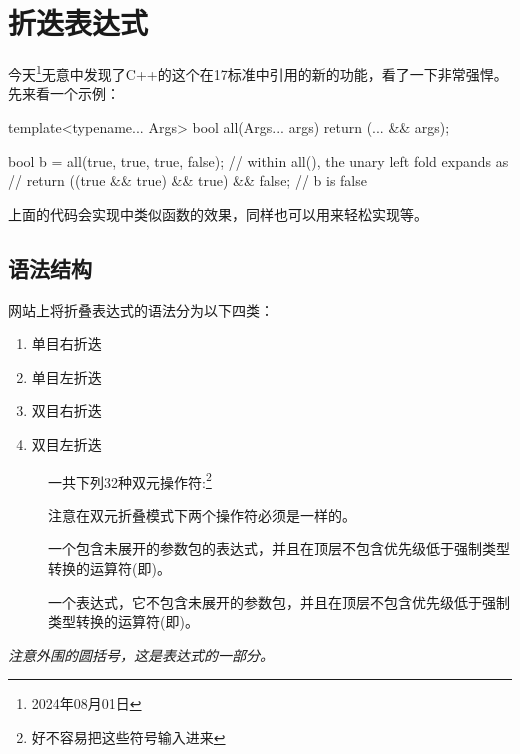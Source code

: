 \chapter{折迭表达式}
今天\footnote{2024年08月01日}无意中发现了C++的这个在17标准中引用的新的功能，看了一下非常强悍。先来看一个示例：
\begin{cpplst}
template<typename... Args>
bool all(Args... args) { return (... && args); }

bool b = all(true, true, true, false);
// within all(), the unary left fold expands as
//  return ((true && true) && true) && false;
// b is false
\end{cpplst}
上面的代码会实现中类似函数的效果，同样也可以用来轻松实现等。

\section{语法结构}
网站上将折叠表达式的语法分为以下四类：
\begin{enumerate}
	\item {} 单目右折迭
	\item {} 单目左折迭
	\item {} 双目右折迭
	\item {} 双目左折迭
\end{enumerate}

\begin{description}
	\item[] 一共下列32种双元操作符:\footnote{好不容易把这些符号输入进来}



	      注意在双元折叠模式下两个操作符必须是一样的。
	\item[] 一个包含未展开的参数包的表达式，并且在顶层不包含优先级低于强制类型转换的运算符(即)。
	\item[]
	      一个表达式，它不包含未展开的参数包，并且在顶层不包含优先级低于强制类型转换的运算符(即)。
\end{description}
\emph{注意外围的圆括号，这是表达式的一部分。}

